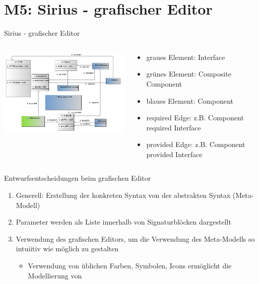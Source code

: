 \section[M5: Sirius]{M5: Sirius - grafischer Editor}
\begin{frame}{Sirius - grafischer Editor}
	\vspace{-5mm}
	\begin{columns}
		\begin{contentblock}{}
			\includegraphics[width=86mm]{figures/sirius.png}
		\end{contentblock}
		\begin{contentblock}{}
			\begin{itemize}
				\item graues Element: Interface
				\item grünes Element: Composite Component
				\item blaues Element: Component
				\item required Edge: z.B. Component required Interface 
				\item provided Edge: z.B. Component provided Interface
			\end{itemize}
		\end{contentblock}
	\end{columns}
\end{frame}

\begin{frame}{Entwurfsentscheidungen beim grafischen Editor}
	\begin{enumerate}
		\item Generell: Erstellung der konkreten Syntax von der abstrakten Syntax (Meta-Modell)
		\item Parameter werden als Liste innerhalb von Signaturblöcken dargestellt
		\item Verwendung des grafischen Editors, um die Verwendung des Meta-Modells so intuiitiv wie möglich zu gestalten
		\begin{itemize}
			\item Verwendung von üblichen Farben, Symbolen, Icons ermöglicht die Modellierung von 
		\end{itemize}
	\end{enumerate}
\end{frame}

